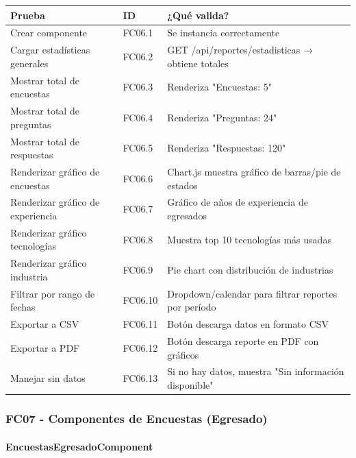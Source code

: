 \begin{table}[H]
\centering
\begin{tabular}{|l|l|p{6cm}|}
\hline
\textbf{Prueba} & \textbf{ID} & \textbf{¿Qué valida?} \\ \hline
Crear componente & FC06.1 & Se instancia correctamente \\ \hline
Cargar estadísticas generales & FC06.2 & GET /api/reportes/estadisticas → obtiene totales \\ \hline
Mostrar total de encuestas & FC06.3 & Renderiza "Encuestas: 5" \\ \hline
Mostrar total de preguntas & FC06.4 & Renderiza "Preguntas: 24" \\ \hline
Mostrar total de respuestas & FC06.5 & Renderiza "Respuestas: 120" \\ \hline
Renderizar gráfico de encuestas & FC06.6 & Chart.js muestra gráfico de barras/pie de estados \\ \hline
Renderizar gráfico de experiencia & FC06.7 & Gráfico de años de experiencia de egresados \\ \hline
Renderizar gráfico tecnologías & FC06.8 & Muestra top 10 tecnologías más usadas \\ \hline
Renderizar gráfico industria & FC06.9 & Pie chart con distribución de industrias \\ \hline
Filtrar por rango de fechas & FC06.10 & Dropdown/calendar para filtrar reportes por período \\ \hline
Exportar a CSV & FC06.11 & Botón descarga datos en formato CSV \\ \hline
Exportar a PDF & FC06.12 & Botón descarga reporte en PDF con gráficos \\ \hline
Manejar sin datos & FC06.13 & Si no hay datos, muestra "Sin información disponible" \\ \hline
\end{tabular}
\end{table}

\subsubsection{FC07 - Componentes de Encuestas (Egresado)}

\paragraph{EncuestasEgresadoComponent}

